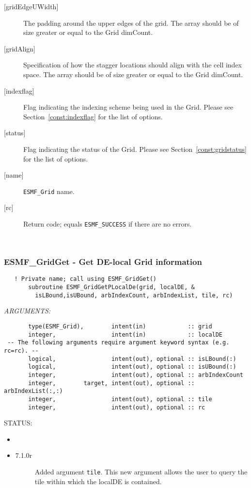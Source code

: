 \begin{description}
   \item[{[gridEdgeUWidth]}]
        The padding around the upper edges of the grid. The array should
     be of size greater or equal to the Grid dimCount.
   \item[{[gridAlign]}]
       Specification of how the stagger locations should align with the cell
       index space. The array should be of size greater or equal to the Grid dimCount.
   \item[{[indexflag]}]
      Flag indicating the indexing scheme being used in the Grid. Please
      see Section~\ref{const:indexflag} for the list of options.
   \item[{[status]}]
      Flag indicating the status of the Grid. Please
      see Section~\ref{const:gridstatus} for the list of options.
  \item[{[name]}]
     {\tt ESMF\_Grid} name.
  \item[{[rc]}]
            Return code; equals {\tt ESMF\_SUCCESS} if there are no errors.
  \end{description}
   
 
\mbox{}\hrulefill\ 
 

  \label{API:GridGetPLocalDe}\subsubsection [ESMF\_GridGet] {ESMF\_GridGet - Get DE-local Grid information}


 
\begin{verbatim}   ! Private name; call using ESMF_GridGet()
       subroutine ESMF_GridGetPLocalDe(grid, localDE, &
         isLBound,isUBound, arbIndexCount, arbIndexList, tile, rc)
 \end{verbatim}{\em ARGUMENTS:}
\begin{verbatim}       type(ESMF_Grid),        intent(in)            :: grid
       integer,                intent(in)            :: localDE
 -- The following arguments require argument keyword syntax (e.g. rc=rc). --
       logical,                intent(out), optional :: isLBound(:)
       logical,                intent(out), optional :: isUBound(:)
       integer,                intent(out), optional :: arbIndexCount
       integer,        target, intent(out), optional :: arbIndexList(:,:)
       integer,                intent(out), optional :: tile
       integer,                intent(out), optional :: rc\end{verbatim}
{\sf STATUS:}
   \begin{itemize}
   \item{}
   \item{}
   \begin{description}
   \item[7.1.0r] Added argument {\tt tile}. This new argument allows the user to 
                 query the tile within which the localDE is contained. 
   \end{description}
   \end{itemize}
  

